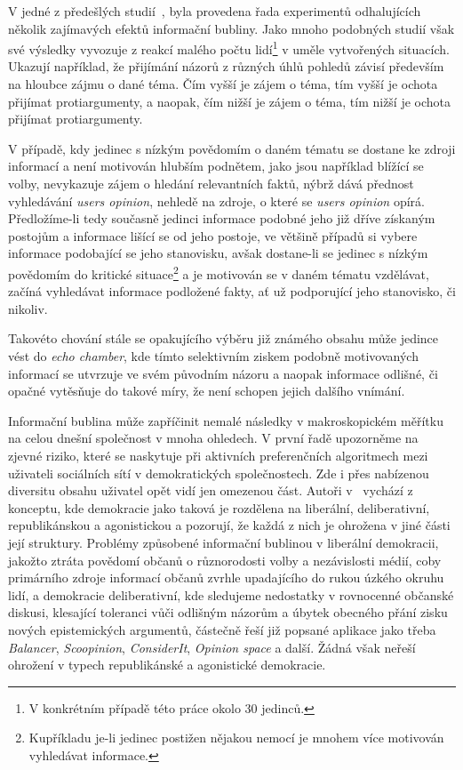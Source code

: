 \documentclass[12pt, a4paper]{article}
\numberwithin{equation}{section} 	%
\begin{document}
V jedné z předešlých studií~\cite{BeyondFilterBubble}, byla provedena řada experimentů odhalujících několik zajímavých efektů informační bubliny. Jako mnoho podobných studií však své výsledky vyvozuje z reakcí malého počtu lidí\footnote{V konkrétním případě této práce okolo 30 jedinců.} v uměle vytvořených situacích. Ukazují například, že přijímání názorů z různých úhlů pohledů závisí především na hloubce zájmu o dané téma. Čím vyšší je zájem o téma, tím vyšší je ochota přijímat protiargumenty, a naopak, čím nižší je zájem o téma, tím nižší je ochota přijímat protiargumenty.

V případě, kdy jedinec s nízkým povědomím o daném tématu se dostane ke zdroji informací a není motivován hlubším podnětem, jako jsou například blížící se volby, nevykazuje zájem o hledání relevantních faktů, nýbrž dává přednost vyhledávání \textit{users opinion}, nehledě na zdroje, o které se \textit{users opinion} opírá. Předložíme-li tedy současně jedinci informace podobné jeho již dříve získaným postojům a informace lišící se od jeho postoje, ve většině případů si vybere informace podobající se jeho stanovisku, avšak dostane-li se jedinec s nízkým povědomím do kritické situace\footnote{Kupříkladu je-li jedinec postižen nějakou nemocí je mnohem více motivován vyhledávat informace.} a je motivován se v daném tématu vzdělávat, začíná vyhledávat informace podložené fakty, ať už podporující jeho stanovisko, či nikoliv.

Takovéto chování stále se opakujícího výběru již známého obsahu může jedince vést do \textit{echo chamber}, kde tímto selektivním ziskem podobně motivovaných informací se utvrzuje ve svém původním názoru a naopak informace odlišné, či opačné vytěsňuje do takové míry, že není schopen jejich dalšího vnímání.

Informační bublina může zapříčinit nemalé následky v makroskopickém měřítku na celou dnešní společnost v mnoha ohledech. V první řadě upozorněme na zjevné riziko, které se naskytuje při aktivních preferenčních algoritmech mezi uživateli sociálních sítí v demokratických společnostech. Zde i přes nabízenou diversitu obsahu uživatel opět vidí jen omezenou část. Autoři v~\cite{BreakingTheFilterBubble} vychází z konceptu, kde demokracie jako taková je rozdělena na liberální, deliberativní, republikánskou a agonistickou a pozorují, že každá z nich je ohrožena v jiné části její struktury. Problémy způsobené informační bublinou v liberální demokracii, jakožto ztráta povědomí občanů o různorodosti volby a nezávislosti médií, coby primárního zdroje informací občanů zvrhle upadajícího do rukou úzkého okruhu lidí, a demokracie deliberativní, kde sledujeme nedostatky v rovnocenné občanské diskusi, klesající toleranci vůči odlišným názorům a úbytek obecného přání zisku nových epistemických argumentů, částečně řeší již popsané aplikace jako třeba \textit{Balancer}, \textit{Scoopinion}, \textit{ConsiderIt}, \textit{Opinion space} a další. Žádná však neřeší ohrožení v typech republikánské a agonistické demokracie.
\end{document}
